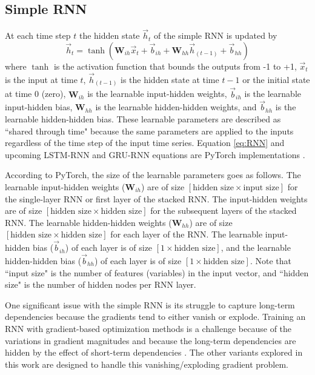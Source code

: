 \subsection{Simple RNN}
At each time step $t$ the hidden state $\vec{h}_{t}$ of the simple \ac{RNN} is updated by
\begin{equation} \label{eq:RNN}
	\vec{h}_{t} = \tanh\left(\textbf{W}_{ih} \vec{x}_{t} + \vec{b}_{ih} + \textbf{W}_{hh} \vec{h}_{\left(t-1\right)} + \vec{b}_{hh}\right)
\end{equation}
where $\tanh$ is the activation function that bounds the outputs from -1 to +1, $\vec{x}_{t}$ is the input at time $t$, $\vec{h}_{\left(t-1\right)}$ is the hidden state at time $t-1$ or the initial state at time 0 (zero), $\textbf{W}_{ih}$ is the learnable input-hidden weights, $\vec{b}_{ih}$ is the learnable input-hidden bias, $\textbf{W}_{hh}$ is the learnable hidden-hidden weights, and $\vec{b}_{hh}$ is the learnable hidden-hidden bias. These learnable parameters are described as ``shared through time" because the same parameters are applied to the inputs regardless of the time step of the input time series. Equation \ref{eq:RNN} and upcoming \ac{LSTM-RNN} and \ac{GRU-RNN} equations are PyTorch implementations \cite{PyTorch}.

According to PyTorch, the size of the learnable parameters goes as follows. The learnable input-hidden weights ($\textbf{W}_{ih}$) are of size $\left[\text{hidden size} \times \text{input size}\right]$ for the single-layer \ac{RNN} or first layer of the stacked \ac{RNN}. The input-hidden weights are of size $\left[\text{hidden size} \times \text{hidden size}\right]$ for the subsequent layers of the stacked \ac{RNN}. The learnable hidden-hidden weights ($\textbf{W}_{hh}$) are of size $\left[\text{hidden size} \times \text{hidden size}\right]$ for each layer of the \ac{RNN}. The learnable input-hidden bias ($\vec{b}_{ih}$) of each layer is of size $\left[\text{1} \times \text{hidden size}\right]$, and the learnable hidden-hidden bias ($\vec{b}_{hh}$) of each layer is of size $\left[\text{1} \times \text{hidden size}\right]$. Note that ``input size" is the number of features (variables) in the input vector, and ``hidden size" is the number of hidden nodes per \ac{RNN} layer.

One significant issue with the simple \ac{RNN} is its struggle to capture long-term dependencies because the gradients tend to either vanish or explode. Training an \ac{RNN} with gradient-based optimization methods is a challenge because of the variations in gradient magnitudes and because the long-term dependencies are hidden by the effect of short-term dependencies \cite{GRU}. The other variants explored in this work are designed to handle this vanishing/exploding gradient problem.

